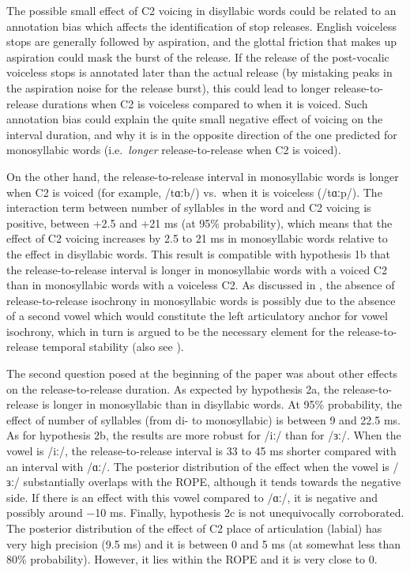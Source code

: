 \documentclass[12pt,a4paper,]{article}
\begin{document}
The possible small effect of C2 voicing in disyllabic words could be
related to an annotation bias which affects the identification of stop
releases. English voiceless stops are generally followed by aspiration,
and the glottal friction that makes up aspiration could mask the burst
of the release. If the release of the post-vocalic voiceless stops is
annotated later than the actual release (by mistaking peaks in the
aspiration noise for the release burst), this could lead to longer
release-to-release durations when C2 is voiceless compared to when it is
voiced. Such annotation bias could explain the quite small negative
effect of voicing on the interval duration, and why it is in the
opposite direction of the one predicted for monosyllabic words
(i.e.~\emph{longer} release-to-release when C2 is voiced).

On the other hand, the release-to-release interval in monosyllabic words
is longer when C2 is voiced (for example, /tɑːb/) vs.~when it is
voiceless (/tɑːp/). The interaction term between number of syllables in
the word and C2 voicing is positive, between +2.5 and +21 ms (at 95\%
probability), which means that the effect of C2 voicing increases by 2.5
to 21 ms in monosyllabic words relative to the effect in disyllabic
words. This result is compatible with hypothesis 1b that the
release-to-release interval is longer in monosyllabic words with a
voiced C2 than in monosyllabic words with a voiceless C2. As discussed
in , the absence of release-to-release isochrony in
monosyllabic words is possibly due to the absence of a second vowel
which would constitute the left articulatory anchor for vowel isochrony,
which in turn is argued to be the necessary element for the
release-to-release temporal stability (also see ).

The second question posed at the beginning of the paper was about other
effects on the release-to-release duration. As expected by hypothesis
2a, the release-to-release is longer in monosyllabic than in disyllabic
words. At 95\% probability, the effect of number of syllables (from di-
to monosyllabic) is between 9 and 22.5 ms. As for hypothesis 2b, the
results are more robust for /iː/ than for /ɜː/. When the vowel is /iː/,
the release-to-release interval is 33 to 45 ms shorter compared with an
interval with /ɑː/. The posterior distribution of the effect when the
vowel is /ɜː/ substantially overlaps with the ROPE, although it tends
towards the negative side. If there is an effect with this vowel
compared to /ɑː/, it is negative and possibly around −10 ms. Finally,
hypothesis 2c is not unequivocally corroborated. The posterior
distribution of the effect of C2 place of articulation (labial) has very
high precision (9.5 ms) and it is between 0 and 5 ms (at somewhat less
than 80\% probability). However, it lies within the ROPE and it is very
close to 0.
\end{document}
